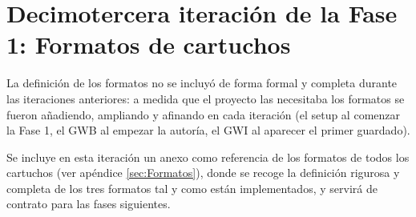 \section{Decimotercera iteración de la Fase 1: Formatos de cartuchos}
\label{sec:F1I13}

La definición de los formatos no se incluyó de forma formal y
completa durante las iteraciones anteriores: a medida que el proyecto las
necesitaba los formatos se fueron añadiendo, ampliando y afinando en cada iteración (el setup al comenzar la Fase 1, el GWB al empezar la autoría, el GWI al aparecer el primer guardado). 

Se incluye en esta iteración un anexo como referencia de los formatos de todos los cartuchos (ver apéndice \ref{sec:Formatos}), donde se recoge la definición rigurosa y completa de los tres formatos tal y como están implementados, y servirá de contrato para las fases siguientes.

